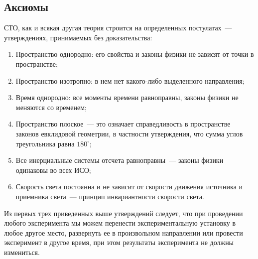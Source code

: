 \subsection{Аксиомы}
СТО, как и всякая другая теория строится на определенных постулатах~--- утверждениях, принимаемых без доказательства:
\begin{enumerate}
	\item Пространство однородно: его свойства и законы физики не зависят от точки в пространстве;
	\item Пространство изотропно: в нем нет какого-либо выделенного направления;
	\item Время однородно: все моменты времени равноправны, законы физики не меняются со временем;
	\item Пространство плоское~--- это означает справедливость в пространстве законов евклидовой геометрии, в частности утверждения, что сумма углов треугольника равна $180^{\circ}$;
	\item Все инерциальные системы отсчета равноправны~--- законы физики одинаковы во всех ИСО;
	\item Скорость света постоянна и не зависит от скорости движения источника и приемника света~--- принцип инвариантности скорости света.
\end{enumerate}
Из первых трех приведенных выше утверждений следует, что при проведении любого эксперимента мы можем перенести экспериментальную установку в любое другое место, развернуть ее в произвольном направлении или провести эксперимент в другое время, при этом результаты эксперимента не должны измениться.